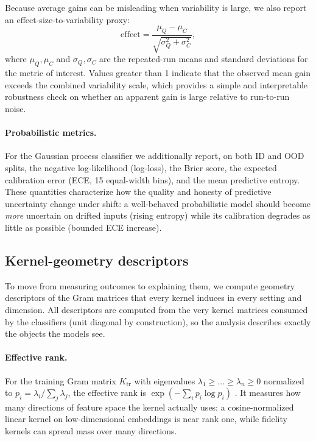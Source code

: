 \documentclass[journal]{IEEEtran}
\begin{document}
Because average gains can be misleading when variability is large, we also report an effect-size-to-variability proxy:
\[
\mathrm{effect} =
\frac{\mu_Q - \mu_C}{\sqrt{\sigma_Q^2 + \sigma_C^2}},
\]
where $\mu_Q,\mu_C$ and $\sigma_Q,\sigma_C$ are the repeated-run means and standard deviations for the metric of interest. Values greater than 1 indicate that the observed mean gain exceeds the combined variability scale, which provides a simple and interpretable robustness check on whether an apparent gain is large relative to run-to-run noise.

\paragraph{Probabilistic metrics.}
For the Gaussian process classifier we additionally report, on both ID and OOD splits, the negative log-likelihood (log-loss), the Brier score, the expected calibration error (ECE, 15 equal-width bins), and the mean predictive entropy. These quantities characterize how the quality and honesty of predictive uncertainty change under shift: a well-behaved probabilistic model should become \emph{more} uncertain on drifted inputs (rising entropy) while its calibration degrades as little as possible (bounded ECE increase).

\subsection{Kernel-geometry descriptors}
\label{sec:geometry_methods}

To move from measuring outcomes to explaining them, we compute geometry descriptors of the Gram matrices that every kernel induces in every setting and dimension. All descriptors are computed from the very kernel matrices consumed by the classifiers (unit diagonal by construction), so the analysis describes exactly the objects the models see.

\paragraph{Effective rank.}
For the training Gram matrix $K_{\mathrm{tr}}$ with eigenvalues $\lambda_1 \ge \dots \ge \lambda_n \ge 0$ normalized to $p_i = \lambda_i / \sum_j \lambda_j$, the effective rank is $\exp(-\sum_i p_i \log p_i)$ \cite{roy2007effective}. It measures how many directions of feature space the kernel actually uses: a cosine-normalized linear kernel on low-dimensional embeddings is near rank one, while fidelity kernels can spread mass over many directions.
\end{document}
